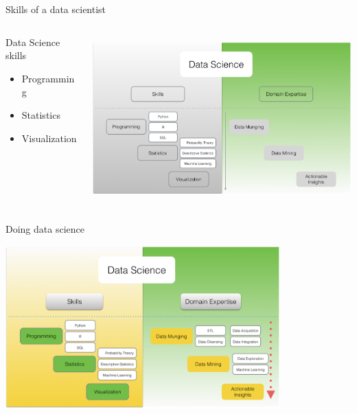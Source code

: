 \documentclass[10pt]{beamer}
\begin{document}
    \begin{frame}{Skills of a data scientist}
      \begin{columns}
        \begin{column}{0.38\textwidth}
         \begin{block}{Data Science skills}
          \smallskip
           \begin{itemize}
             \item Programming
             \smallskip
             \item Statistics
             \smallskip
             \item Visualization
           \end{itemize}
         \end{block}
        \end{column}
        \begin{column}{0.6\textwidth}
          \begin{center}
            \includegraphics[height=180pt]{../graphs/data_science_skills}
          \end{center}
        \end{column}
      \end{columns}
    \end{frame}

    \begin{frame}{Doing data science}
      \begin{center}
        \includegraphics[width=300pt]{../graphs/data_science_skills_domain}
      \end{center}
    \end{frame}
\end{document}
